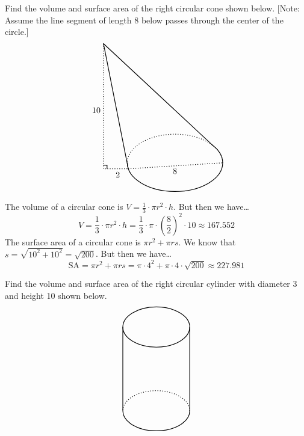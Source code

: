 \documentclass[11pt,letterpaper]{article}
\begin{document}

 Find the volume and surface area of the right circular cone shown below. [Note: Assume the line segment of length 8 below passes through the center of the circle.]
	\[
	\begin{tikzpicture}
	\draw[line width=0.03cm] (-1.96,-0.25) -- (-3,5);
	\draw[line width=0.03cm] (1.58,0.735) -- (-3,5);    
	                                                           
	\draw[line width=0.03cm,dotted] (-3,5) -- (-3,-0.25) -- (-1.96,-0.25);
	\draw[line width=0.03cm] (-3,-0.1) -- (-2.85,-0.1) -- (-2.85,-0.25);
	\node at (-3.3,2.2) {$10$};
	
	\draw[line width=0.03cm,dotted] (-1.96,-0.25) -- (2,0);
	\node at (0,-0.35) {$8$};
	
	\node at (-2.4,-0.5) {$2$};
	
	\draw[line width=0.03cm,dotted] (2, 0) arc [start angle=0, end angle=180, x radius= 2, y radius= 1.2];
	\draw[line width=0.03cm] (-2, 0) arc [start angle=180, end angle=400, x radius= 2, y radius= 1.2];	
	\end{tikzpicture}
	\] \pspace

\sol The volume of a circular cone is $V= \frac{1}{3} \cdot \pi r^2 \cdot h$. But then we have\dots
	\[
	V= \frac{1}{3} \cdot \pi r^2 \cdot h= \frac{1}{3} \cdot \pi \cdot \left( \frac{8}{2} \right)^2 \cdot 10 \approx 167.552
	\]
The surface area of a circular cone is $\pi r^2 + \pi r s$. We know that $s= \sqrt{10^2 + 10^2}= \sqrt{200}$. But then we have\dots
	\[
	\text{SA}= \pi r^2 + \pi r s= \pi \cdot 4^2 + \pi \cdot 4 \cdot \sqrt{200} \approx 227.981
	\]



\newpage



 Find the volume and surface area of the right circular cylinder with diameter 3 and height 10 shown below.
	\[
	\begin{tikzpicture}[scale=0.7]
	\draw[line width=0.03cm] (0,5) ellipse (2 and 1.2);
	\draw[line width=0.03cm] (-2,5) -- (-2,0);
	\draw[line width=0.03cm] (2,5) -- (2,0);
	\draw[line width=0.03cm,dotted] (2, 0) arc [start angle=0, end angle=180, x radius= 2, y radius= 1.2];
	\draw[line width=0.03cm] (-2, 0) arc [start angle=180, end angle=360, x radius= 2, y radius= 1.2];
	\end{tikzpicture}
	\] \pspace
\end{document}
